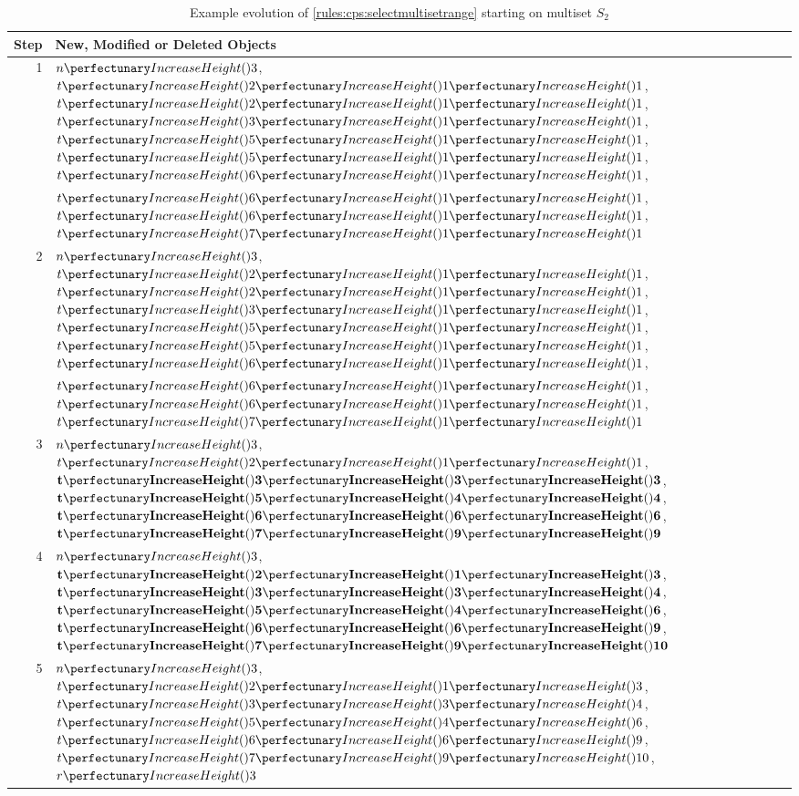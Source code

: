 \begin{table} \centering
   \begin{tabular}{|r|l|}
    \hline
    \textbf{Step} & \textbf{New, Modified or Deleted Objects} \\ \hline
    1 & \(\cpfunc{n}{3}\), \(\cpfuncnn{t}{2}{1}{1}\), \(\cpfuncnn{t}{2}{1}{1}\), \(\cpfuncnn{t}{3}{1}{1}\), \(\cpfuncnn{t}{5}{1}{1}\), \(\cpfuncnn{t}{5}{1}{1}\), \(\cpfuncnn{t}{6}{1}{1}\),\\& \(\cpfuncnn{t}{6}{1}{1}\), \(\cpfuncnn{t}{6}{1}{1}\), \(\cpfuncnn{t}{7}{1}{1}\)\\ \hline
    
    2 & \(\cpfunc{n}{3}\), \(\cpfuncnn{t}{2}{1}{1}\), \sout{\(\cpfuncnn{t}{2}{1}{1}\)}, \(\cpfuncnn{t}{3}{1}{1}\), \(\cpfuncnn{t}{5}{1}{1}\), \sout{\(\cpfuncnn{t}{5}{1}{1}\)}, \(\cpfuncnn{t}{6}{1}{1}\),\\& \sout{\(\cpfuncnn{t}{6}{1}{1}\)}, \sout{\(\cpfuncnn{t}{6}{1}{1}\)}, \(\cpfuncnn{t}{7}{1}{1}\)\\ \hline
    
    
    3 & \(\cpfunc{n}{3}\), \(\cpfuncnn{t}{2}{1}{1}\), \(\mathbf{\cpfuncnn{t}{3}{3}{3}}\), \(\mathbf{\cpfuncnn{t}{5}{4}{4}}\), \(\mathbf{\cpfuncnn{t}{6}{6}{6}}\), \(\mathbf{\cpfuncnn{t}{7}{9}{9}}\)\\ \hline
    
    
    4 & \(\cpfunc{n}{3}\), \(\mathbf{\cpfuncnn{t}{2}{1}{3}}\), \(\mathbf{\cpfuncnn{t}{3}{3}{4}}\), \(\mathbf{\cpfuncnn{t}{5}{4}{6}}\), \(\mathbf{\cpfuncnn{t}{6}{6}{9}}\), \(\mathbf{\cpfuncnn{t}{7}{9}{10}}\)\\ \hline
    
    5 & \(\cpfunc{n}{3}\), \(\cpfuncnn{t}{2}{1}{3}\), \(\cpfuncnn{t}{3}{3}{4}\), \(\cpfuncnn{t}{5}{4}{6}\), \(\cpfuncnn{t}{6}{6}{9}\), \(\cpfuncnn{t}{7}{9}{10}\), \(\cpfunc{r}{3}\)\\ \hline
\end{tabular} 
\caption[Example evolution of \cref{rules:cps:selectmultisetrange}]{\label{tab:cps:selectmultisetrange}Example evolution of \cref{rules:cps:selectmultisetrange} starting on multiset \(S_2\)}
\end{table}

